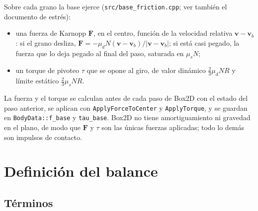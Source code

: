\documentclass[11pt,a4paper]{article}
\newcommand{\vect}[1]{\mathbf{#1}}
\newcommand{\F}{\vect{F}}
\newcommand{\vv}{\vect{v}}
\newcommand{\code}[1]{\texttt{#1}}
\begin{document}
Sobre cada grano la base ejerce (\code{src/base\_friction.cpp}; ver
también el documento de estrés):
\begin{itemize}
  \item una fuerza de Karnopp $\F$, en el centro, función de la velocidad
    relativa $\vv - \vv_b$: si el grano desliza,
    $\F = -\mu_d N (\vv - \vv_b)/|\vv - \vv_b|$; si está casi pegado,
    la fuerza que lo deja pegado al final del paso, saturada en $\mu_s N$;
  \item un torque de pivoteo $\tau$ que se opone al giro, de valor
    dinámico $\frac{2}{3}\mu_d N R$ y límite estático
    $\frac{2}{3}\mu_s N R$.
\end{itemize}
La fuerza y el torque se calculan antes de cada paso de Box2D con el estado
del paso anterior, se aplican con \code{ApplyForceToCenter} y
\code{ApplyTorque}, y se guardan en \code{BodyData::f\_base} y
\code{tau\_base}. Box2D no tiene amortiguamiento ni gravedad en el plano, de
modo que $\F$ y $\tau$ son las únicas fuerzas aplicadas; todo lo demás son
impulsos de contacto.

\section{Definición del balance}

\subsection{Términos}
\end{document}
